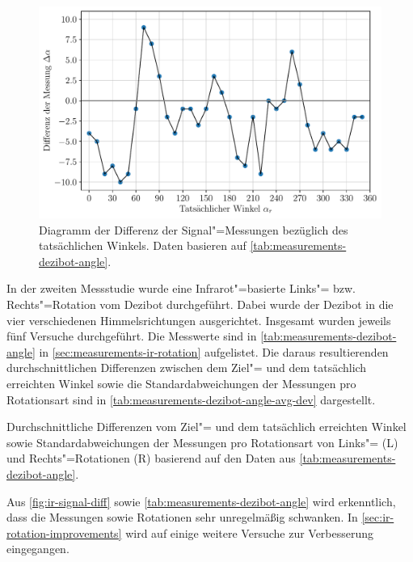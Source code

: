 \begin{figure}[h]
    \centering
    \includegraphics[width=\textwidth]{../plot/ir_signal_diff.pdf}
    \caption{Diagramm der Differenz der Signal"=Messungen bezüglich des tatsächlichen Winkels. Daten basieren auf \autoref{tab:measurements-dezibot-angle}.}
    \label{fig:ir-signal-diff}
\end{figure}

In der zweiten Messstudie wurde eine Infrarot"=basierte Links"= bzw. Rechts"=Rotation vom Dezibot durchgeführt. Dabei wurde der Dezibot in die vier verschiedenen Himmelsrichtungen ausgerichtet. Insgesamt wurden jeweils fünf Versuche durchgeführt. Die Messwerte sind in \autoref{tab:measurements-dezibot-angle} in \autoref{sec:measurements-ir-rotation} aufgelistet. Die daraus resultierenden durchschnittlichen Differenzen zwischen dem Ziel"= und dem tatsächlich erreichten Winkel sowie die Standardabweichungen der Messungen pro Rotationsart sind in \autoref{tab:measurements-dezibot-angle-avg-dev} dargestellt.

\begin{table}[h]
    \centering
    
    \caption{Durchschnittliche Differenzen vom Ziel"= und dem tatsächlich erreichten Winkel sowie Standardabweichungen der Messungen pro Rotationsart von Links"= (L) und Rechts"=Rotationen (R) basierend auf den Daten aus \autoref{tab:measurements-dezibot-angle}.}
    \label{tab:measurements-dezibot-angle-avg-dev}
\end{table}

Aus \autoref{fig:ir-signal-diff} sowie \autoref{tab:measurements-dezibot-angle} wird erkenntlich, dass die Messungen sowie Rotationen sehr unregelmäßig schwanken. In \autoref{sec:ir-rotation-improvements} wird auf einige weitere Versuche zur Verbesserung eingegangen.

